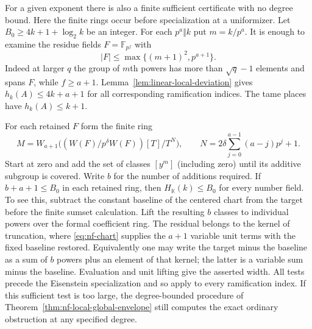 \documentclass[11pt,letterpaper]{article}
\theoremstyle{definition}
\numberwithin{equation}{section}
\begin{document}
For a given exponent there is also a finite sufficient certificate
with no degree bound. Here the finite rings occur before
specialization at a uniformizer. Let $B_0\ge4k+1+\log_2 k$ be an
integer. For each $p^a\Vert k$ put $m=k/p^a$. It is enough to
examine the residue fields $F=\mathbb F_{p^f}$ with
\[
                    |F|\le\max\{(m+1)^2,p^{a+1}\}.
\]
Indeed at larger $q$ the group of $m$th powers has more than
$\sqrt q-1$ elements and spans $F$, while $f\ge a+1$.
Lemma~\ref{lem:linear-local-deviation} gives $h_k(A)\le4k+a+1$
for all corresponding ramification indices. The tame places have
$h_k(A)\le k+1$.

For each retained $F$ form the finite ring
\[
 M=W_{a+1}\big((W(F)/p^\delta W(F))[T]/T^N\big),
                 \qquad N=2\delta\sum_{j=0}^{a-1}(a-j)p^j+1.
\]
Start at zero and add the set of classes $[y^m]$ (including zero)
until its additive subgroup is covered. Write $b$ for the number
of additions required. If $b+a+1\le B_0$ in each retained ring,
then $H_{\mathbb K}(k)\le B_0$ for every number field.
To see this, subtract the constant baseline of the centered chart
from the target before the finite sumset calculation. Lift the
resulting $b$ classes to individual powers over the formal
coefficient ring. The residual belongs to the kernel of truncation,
where \eqref{eq:nf-chart} supplies the $a+1$ variable unit terms
with the fixed baseline restored. Equivalently one may write the
target minus the baseline as a sum of $b$ powers plus an element
of that kernel; the latter is a variable sum minus the baseline.
Evaluation and unit lifting give the asserted width. All tests
precede the Eisenstein specialization and so apply to every
ramification index. If this sufficient test is too large, the
degree-bounded procedure of Theorem~\ref{thm:nf-local-global-envelope}
still computes the exact ordinary obstruction at any specified degree.
\end{document}
